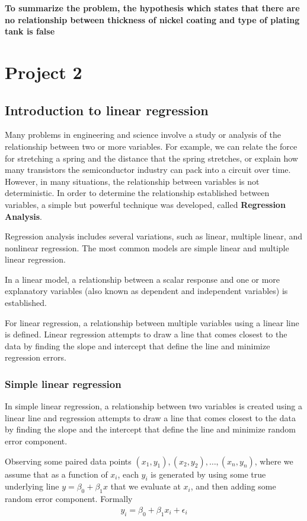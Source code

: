 \documentclass[a4paper]{article}
\numberwithin{equation}{section}
\begin{document}
\textbf{To summarize the problem, the hypothesis which states that there are no relationship between thickness of nickel coating and type of plating tank is false}

\newpage
\section{Project 2}
\subsection{Introduction to linear regression}
Many problems in engineering and science involve a study or analysis of the relationship between two or more variables.
For example, we can relate the force for stretching a spring and the distance that the spring stretches, or explain how many transistors the semiconductor industry can pack into a circuit over time.
However, in many situations, the relationship between variables is not deterministic. In order to determine the relationship established between variables, a simple but powerful technique was developed, called \textbf{Regression Analysis}.

Regression analysis includes several variations, such as linear, multiple linear, and nonlinear regression. The most common models are simple linear and multiple linear regression.

In a linear model, a relationship between a scalar response and one or more explanatory variables (also known as dependent and independent variables) is established.

For linear regression, a relationship between multiple variables using a linear line is defined. Linear regression attempts to draw a line that comes closest to the data by finding the slope and intercept that define the line and minimize regression errors.

\subsubsection{Simple linear regression}\label{simpleLRDef}
In simple linear regression, a relationship between two variables is created using a linear line and regression attempts to draw a line that comes closest to the data by finding the slope and the intercept that define the line and minimize random error component.

Observing some paired data points \((x_1, y_1), (x_2, y_2), \dots, (x_n, y_n)\), where we assume that as a function of \(x_i\), each \(y_i\) is generated by using some true underlying line \(y = \beta_0 + \beta_1x\) that we evaluate at \(x_i\), and then adding some random error component.
Formally
\begin{align*}
  y_i = \beta_0 + \beta_1x_i + \epsilon_i
\end{align*}
\end{document}
